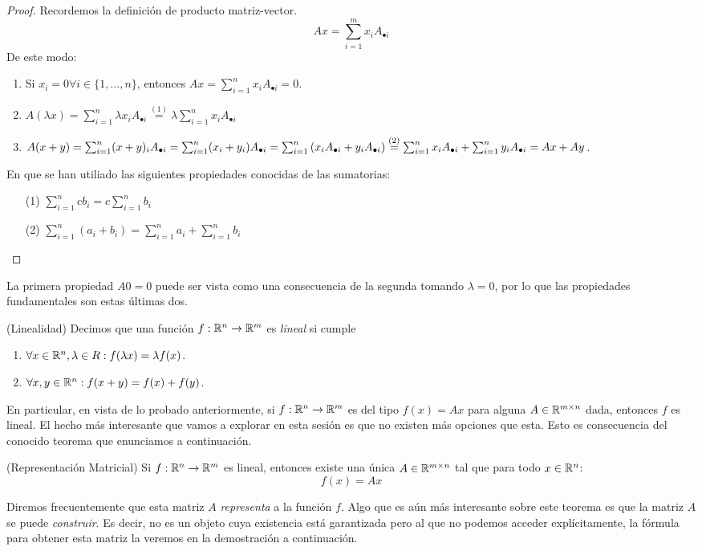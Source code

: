 \begin{proof}
    Recordemos la definición de producto matriz-vector.
    \[Ax = \sum_{i = 1}^m x_i A_{\bullet i}\]
    De este modo:
    \begin{enumerate}
        \item Si $x_i = 0 \forall i \in \{1, \dots, n\}$, entonces $Ax = \sum_{i=1}^n x_i A_{\bullet i} = 0$.
        \item $A(\lambda x) = \sum_{i=1}^n \lambda x_i A_{\bullet i} \overset{(1)}{=} \lambda \sum_{i=1}^n x_i A_{\bullet i}$
        \item $A(x + y) = \sum_{i=1}^n (x+y)_i A_{\bullet i} = \sum_{i=1}^n (x_i + y_i)A_{\bullet i} = \sum_{i=1}^n \qty(x_i A_{\bullet i} + y_i A_{\bullet i}) \overset{(2)}{=} \sum_{i=1}^n x_i A_{\bullet i} + \sum_{i=1}^n y_i A_{\bullet i} = Ax + Ay$.
    \end{enumerate}
    En que se han utiliado las siguientes propiedades conocidas de las sumatorias:
    \begin{enumerate}
        \item[(1)] $\sum_{i=1}^n c b_i = c\sum_{i=1}^n b_i$
        \item[(2)] $\sum_{i=1}^n (a_i + b_i) = \sum_{i=1}^n a_i + \sum_{i=1}^n b_i$
    \end{enumerate}
\end{proof}

\begin{remark}
    La primera propiedad $A0 = 0$ puede ser vista como una consecuencia de la segunda tomando $\lambda = 0$, por lo que las propiedades fundamentales son estas últimas dos.
\end{remark}

\begin{definition}(Linealidad)
    Decimos que una función $f: \mathbb{R}^n \to \mathbb{R}^m$ es \textit{lineal} si cumple
    \begin{enumerate}
        \item $\forall x \in \mathbb{R}^n, \lambda \in R : f(\lambda x) = \lambda f(x)$.
        \item $\forall x, y \in \mathbb{R}^n : f(x + y) = f(x) + f(y)$.
    \end{enumerate}
\end{definition}

En particular, en vista de lo probado anteriormente, si $f: \mathbb{R}^n \to \mathbb{R}^m$ es del tipo $f(x) = Ax$ para alguna $A \in \mathbb{R}^{m \times n}$ dada, entonces $f$ es lineal. El hecho más interesante que vamos a explorar en esta sesión es que no existen más opciones que esta. Esto es consecuencia del conocido teorema que enunciamos a continuación.
\begin{theorem}(Representación Matricial)
    Si $f: \mathbb{R}^n \to \mathbb{R}^m$ es lineal, entonces existe una única $A \in \mathbb{R}^{m \times n}$ tal que para todo $x \in \mathbb{R}^n$:
    \[f(x) = Ax\]
\end{theorem}
Diremos frecuentemente que esta matriz $A$ \textit{representa} a la función $f$. Algo que es aún más interesante sobre este teorema es que la matriz $A$ se puede \textit{construir}. Es decir, no es un objeto cuya existencia está garantizada pero al que no podemos acceder explícitamente, la fórmula para obtener esta matriz la veremos en la demostración a continuación.

